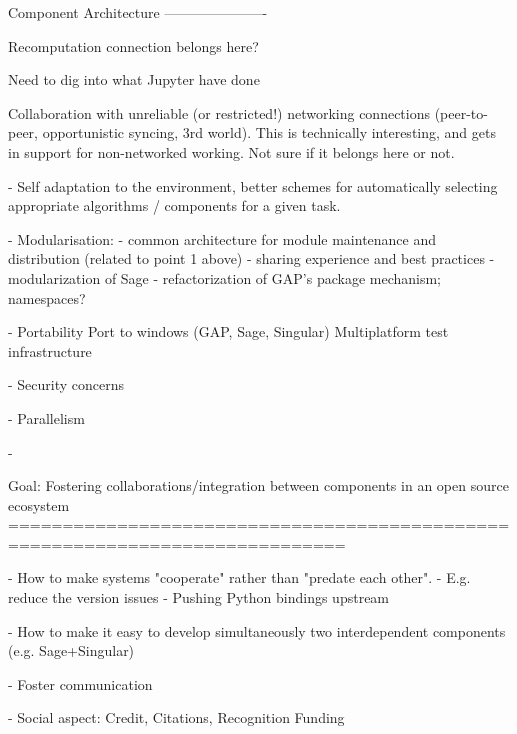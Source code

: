 \begin{Workpackage}{\thewpno}
Component Architecture
----------------------

Recomputation connection belongs here?

Need to dig into what Jupyter have done

Collaboration with unreliable (or restricted!) networking connections
(peer-to-peer, opportunistic syncing, 3rd world). This is technically
interesting, and gets in support for non-networked working. Not sure
if it belongs here or not.

- Self adaptation to the environment, better schemes for automatically
  selecting appropriate algorithms / components for a given task.

- Modularisation:
  - common architecture for module maintenance and distribution
    (related to point 1 above)
  - sharing experience and best practices
  - modularization of Sage
  - refactorization of GAP's package mechanism; namespaces?

- Portability
  Port to windows (GAP, Sage, Singular)
  Multiplatform test infrastructure

- Security concerns

- Parallelism

- 


Goal: Fostering collaborations/integration between components in an open source ecosystem
=============================================================================

- How to make systems "cooperate" rather than "predate each other".
- E.g. reduce the version issues
- Pushing Python bindings upstream

- How to make it easy to develop simultaneously two interdependent
  components (e.g. Sage+Singular)

- Foster communication

- Social aspect:
  Credit, Citations, Recognition
  Funding




\end{Workpackage}
